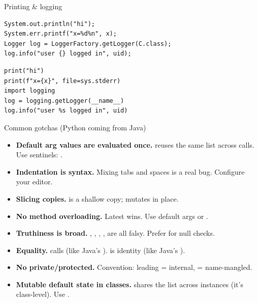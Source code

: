 \documentclass[10pt]{article}
\begin{document}
\begin{construct}{Printing \& logging}
\noindent
\begin{minipage}[t]{0.485\linewidth}
\begin{lstlisting}[style=java, title=Java]
System.out.println("hi");
System.err.printf("x=%d%n", x);
Logger log = LoggerFactory.getLogger(C.class);
log.info("user {} logged in", uid);
\end{lstlisting}
\end{minipage}\hfill
\begin{minipage}[t]{0.485\linewidth}
\begin{lstlisting}[style=python, title=Python]
print("hi")
print(f"x={x}", file=sys.stderr)
import logging
log = logging.getLogger(__name__)
log.info("user %s logged in", uid)
\end{lstlisting}
\end{minipage}
\end{construct}

\begin{construct}{Common gotchas (Python coming from Java)}
\noindent
\begin{minipage}[t]{\linewidth}
\small
\begin{itemize}[leftmargin=*, itemsep=1pt, topsep=1pt]
  \item \textbf{Default arg values are evaluated once.}  reuses the same list across calls. Use  sentinels: .
  \item \textbf{Indentation is syntax.} Mixing tabs and spaces is a real bug. Configure your editor.
  \item \textbf{Slicing copies.}  is a shallow copy;  mutates in place.
  \item \textbf{No method overloading.} Latest  wins. Use default args or .
  \item \textbf{Truthiness is broad.} , , \code{[]}, \code{\{\}},  are all falsy. Prefer  for null checks.
  \item \textbf{Equality.} \code{==} calls  (like Java's ).  is identity (like Java's \code{==}).
  \item \textbf{No private/protected.} Convention: leading \code{\_} = internal,  = name-mangled.
  \item \textbf{Mutable default state in classes.}  shares the list across instances (it's class-level). Use .
\end{itemize}
\end{minipage}
\end{construct}
\end{document}
